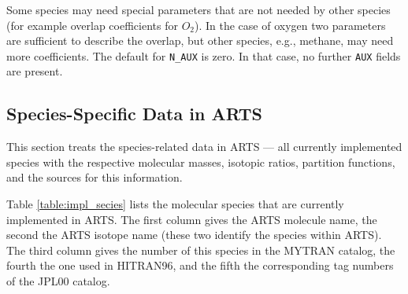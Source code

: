 Some species may need special parameters that are not needed by other
species (for example overlap coefficients for $O_2$). In the case of
oxygen two parameters are sufficient to describe the overlap, but
other species, e.g., methane, may need more coefficients. The default
for \texttt{N\_AUX} is zero. In that case, no further \texttt{AUX}
fields are present.


\subsection{Species-Specific Data in ARTS}

This section treats the species-related data in ARTS --- all
currently implemented species with the respective molecular masses,
isotopic ratios, partition functions, and the sources for this
information. 

Table \ref{table:impl_secies} lists the molecular species that are
currently implemented in ARTS.
The first column gives the ARTS molecule name, the second the ARTS
isotope name (these two identify the species within ARTS). The third
column gives the number of this species in the MYTRAN catalog, the fourth
the one used in HITRAN96, and the fifth the corresponding tag numbers
of the JPL00 catalog.


